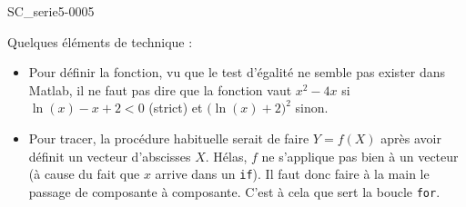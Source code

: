 \begin{corrige}{SC_serie5-0005}

	Quelques éléments de technique :
	\begin{itemize}
		\item 
			Pour définir la fonction, vu que le test d'égalité ne semble pas exister dans Matlab, il ne faut pas dire que la fonction vaut $x^2-4x$ si $\ln(x)-x+2<0$ (strict) et $\big( \ln(x)+2 \big)^2$ sinon.
		\item
			Pour tracer, la procédure habituelle serait de faire $Y=f(X)$ après avoir définit un vecteur d'abscisses $X$. Hélas, $f$ ne s'applique pas bien à un vecteur (à cause du fait que $x$ arrive dans un \verb+if+). Il faut donc faire à la main le passage de composante à composante. C'est à cela que sert la boucle \verb+for+.
	\end{itemize}
	


\end{corrige}
